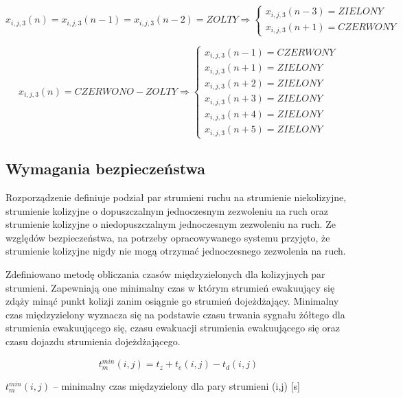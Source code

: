 \begin{equation}
	\label{formalne:zolty}
	x_{i, j, 3} (n) = x_{i, j, 3} (n-1) = x_{i, j, 3} (n-2) = ZOLTY \Longrightarrow \left\{
	\begin{array}{c}
		x_{i, j, 3} (n-3) = ZIELONY\\
		x_{i, j, 3} (n+1) = CZERWONY
	\end{array}
\end{equation}

\begin{equation}
	\label{formalne:czerwono_zolty}
	x_{i, j, 3} (n) = CZERWONO-ZOLTY \Longrightarrow \left\{
	\begin{array}{c}
		x_{i, j, 3} (n-1) = CZERWONY\\
		x_{i, j, 3} (n+1) = ZIELONY\\
		x_{i, j, 3} (n+2) = ZIELONY\\
		x_{i, j, 3} (n+3) = ZIELONY\\
		x_{i, j, 3} (n+4) = ZIELONY\\
		x_{i, j, 3} (n+5) = ZIELONY
	\end{array}
\end{equation}

\subsection{Wymagania bezpieczeństwa}
Rozporządzenie definiuje podział par strumieni ruchu na strumienie niekolizyjne, strumienie kolizyjne o dopuszczalnym jednoczesnym zezwoleniu na ruch oraz strumienie kolizyjne o niedopuszczalnym jednoczesnym zezwoleniu na ruch. Ze względów bezpieczeństwa, na potrzeby opracowywanego systemu przyjęto, że strumienie kolizyjne nigdy nie mogą otrzymać jednoczesnego zezwolenia na ruch.

Zdefiniowano metodę obliczania czasów międzyzielonych dla kolizyjnych par strumieni. Zapewniają one minimalny czas w którym strumień ewakuujący się zdąży minąć punkt kolizji zanim osiągnie go strumień dojeżdżający. Minimalny czas międzyzielony wyznacza się na podstawie czasu trwania sygnału żółtego dla strumienia ewakuującego się, czasu ewakuacji strumienia ewakuującego się oraz czasu dojazdu strumienia dojeżdżającego.

\begin{equation}
	t^{min}_{m} (i,j) = t_{z} + t_{e} (i,j) - t_{d} (i,j)
\end{equation}

\begin{math} t^{min}_{m} (i,j) \end{math} \textrm{ -- minimalny czas międzyzielony dla pary strumieni (i,j) [s]}

